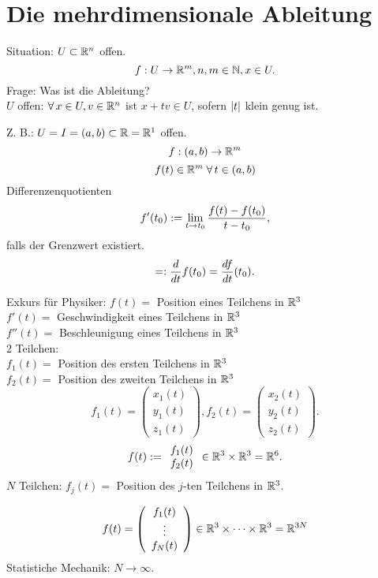 \documentclass[../ana2.tex]{subfiles}
\begin{document}
\setcounter{section}{9}
\section{Die mehrdimensionale Ableitung}
Situation: \( U \subset \mathbb{R}^n \) offen. 
\[ f:U\rightarrow \mathbb{R}^m, n,m\in\mathbb{N}, x\in U. \]
Frage: Was ist die Ableitung?\\
\( U \) offen: \( \forall x\in U, v\in \R^n \) 
ist \( x + tv \in U \), sofern 
\( \left|t\right| \) klein genug ist.

Z. B.: \( U = I = (a,b) \subset \mathbb{R} = \mathbb{R}^1 \)
offen. \[ f:(a,b)\rightarrow \mathbb{R}^m \]
\[ f(t) \in \R^m \;\forall t\in (a,b) \]
Differenzenquotienten 
\[ f'(t_0) := \lim\limits_{t\rightarrow{}t_0} 
\frac{f(t) - f(t_0)}{t - t_0}, \]
falls der Grenzwert existiert.
\[ =: \frac{d}{dt} f(t_0) = \frac{df}{dt} (t_0). \]

Exkurs für Physiker:
\( f(t) = \) Position eines Teilchens in \( \mathbb{R}^3 \) \\
\( f'(t) =  \) Geschwindigkeit eines Teilchens in \( \mathbb{R}^3 \) \\
\( f''(t) =  \) Beschleunigung eines Teilchens in \( \mathbb{R}^3 \) \\

2 Teilchen:\\ 
\( f_1(t) = \) Position des ersten Teilchens in \( \mathbb{R}^3 \) \\
\( f_2(t) = \) Position des zweiten Teilchens in \( \mathbb{R}^3 \)
\[ f_1(t) = \left( \begin{array}{c}
    x_1(t)\\
    y_1(t)\\
    z_1(t)
\end{array} \right), 
f_2(t) = \left( \begin{array}{c}
    x_2(t)\\
    y_2(t)\\
    z_2(t)
\end{array} \right). \]
\[ f(t) := \begin{array}{c}
    f_1(t)\\f_2(t)
\end{array} \in \mathbb{R}^3 \times \mathbb{R}^3 = \mathbb{R}^6. \]
\( N \) Teilchen: \( f_j(t) = \) Position 
des \( j \)-ten Teilchens in \( \mathbb{R}^3 \).

\[ f(t) = \left( \begin{array}{c}
    f_1(t)\\
    \vdots \\
    f_N(t)
\end{array} \right) \in \mathbb{R}^3 \times \cdots \times \mathbb{R}^3 
= \mathbb{R}^{3N} \]
Statistiche Mechanik: \( N \rightarrow \infty \).
\end{document}
